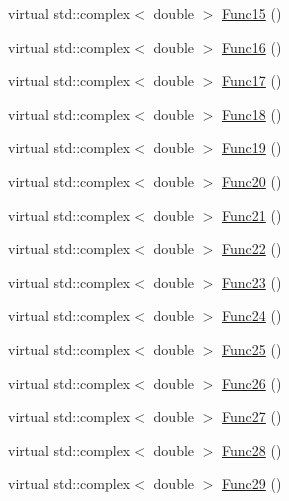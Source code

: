 \begin{DoxyCompactItemize}
virtual std\-::complex$<$ double $>$ \hyperlink{classosea_1_1ofreq_1_1_equationof_motion_a6fb116fda50fff5f6a551033809866bc}{Func15} ()
\item 
virtual std\-::complex$<$ double $>$ \hyperlink{classosea_1_1ofreq_1_1_equationof_motion_aad2958f7e57f06d5b7a9f807d565bbc7}{Func16} ()
\item 
virtual std\-::complex$<$ double $>$ \hyperlink{classosea_1_1ofreq_1_1_equationof_motion_a9b2c9a471dbc0d48ddf025a8a0c55f1f}{Func17} ()
\item 
virtual std\-::complex$<$ double $>$ \hyperlink{classosea_1_1ofreq_1_1_equationof_motion_a3cbd356ecdd5bc045dc98421d6283170}{Func18} ()
\item 
virtual std\-::complex$<$ double $>$ \hyperlink{classosea_1_1ofreq_1_1_equationof_motion_a27e79b31834844a40c870436ac62ae73}{Func19} ()
\item 
virtual std\-::complex$<$ double $>$ \hyperlink{classosea_1_1ofreq_1_1_equationof_motion_a7232042c946e1e2fd2c5d6e9e5929300}{Func20} ()
\item 
virtual std\-::complex$<$ double $>$ \hyperlink{classosea_1_1ofreq_1_1_equationof_motion_a771493c65f06e5085e3b0c9150aa0427}{Func21} ()
\item 
virtual std\-::complex$<$ double $>$ \hyperlink{classosea_1_1ofreq_1_1_equationof_motion_aa9924875622062551456bab5ea3ecb20}{Func22} ()
\item 
virtual std\-::complex$<$ double $>$ \hyperlink{classosea_1_1ofreq_1_1_equationof_motion_ac5cf42463f4da9f251436e80da15499a}{Func23} ()
\item 
virtual std\-::complex$<$ double $>$ \hyperlink{classosea_1_1ofreq_1_1_equationof_motion_abe255c1e5217273f9adfc3c4c5f83727}{Func24} ()
\item 
virtual std\-::complex$<$ double $>$ \hyperlink{classosea_1_1ofreq_1_1_equationof_motion_a22e70f9d370ce2bd8d10621d6b686da8}{Func25} ()
\item 
virtual std\-::complex$<$ double $>$ \hyperlink{classosea_1_1ofreq_1_1_equationof_motion_aef40214a54959ffffd9b4c45e3fa0648}{Func26} ()
\item 
virtual std\-::complex$<$ double $>$ \hyperlink{classosea_1_1ofreq_1_1_equationof_motion_af534561eec5a3d27212076a60043a23c}{Func27} ()
\item 
virtual std\-::complex$<$ double $>$ \hyperlink{classosea_1_1ofreq_1_1_equationof_motion_a6d12f67c42964bef80db4268b8033c6d}{Func28} ()
\item 
virtual std\-::complex$<$ double $>$ \hyperlink{classosea_1_1ofreq_1_1_equationof_motion_a9e62ab3a3096c28a578367332d5846da}{Func29} ()

\end{DoxyCompactItemize}
